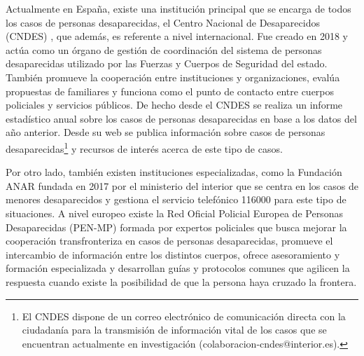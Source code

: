 Actualmente en España, existe una institución principal que se encarga de todos los casos de personas desaparecidas, el Centro Nacional de Desaparecidos (CNDES) \cite{CNDES}, que además, es referente a nivel internacional. Fue creado en 2018 y actúa como un órgano de gestión de coordinación del sistema de personas desaparecidas utilizado por las Fuerzas y Cuerpos de Seguridad del estado. También promueve la cooperación entre instituciones y organizaciones, evalúa propuestas de familiares y funciona como el punto de contacto entre cuerpos policiales y servicios públicos\cite{garcia2019personas}. De hecho desde el CNDES se realiza un informe estadístico anual sobre los casos de personas desaparecidas en base a los datos del año anterior. Desde su web se publica información sobre casos de personas desaparecidas\footnote{El CNDES dispone de un correo electrónico de comunicación directa con la ciudadanía para la transmisión de información vital de los casos que se encuentran actualmente en investigación (colaboracion-cndes@interior.es).} y recursos de interés acerca de este tipo de casos. 

Por otro lado, también existen instituciones especializadas, como la Fundación ANAR \cite{F_ANAR} fundada en 2017 por el ministerio del interior que se centra en los casos de menores desaparecidos y gestiona el servicio telefónico 116000 para este tipo de situaciones. A nivel europeo existe la Red Oficial Policial Europea de Personas Desaparecidas (PEN-MP)\cite{PEN-MP} formada por expertos policiales que busca mejorar la cooperación transfronteriza en casos de personas desaparecidas, promueve el intercambio de información entre los distintos cuerpos, ofrece asesoramiento y formación especializada y desarrollan guías y protocolos comunes que agilicen la respuesta cuando existe la posibilidad de que la persona haya cruzado la frontera.

